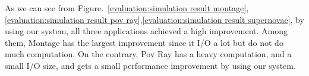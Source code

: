 As we can see from Figure.~\ref{evaluation:simulation result montage},\ref{evaluation:simulation
result pov ray},\ref{evaluation:simulation result supernovae}, by using our system, all three
applications achieved a high improvement.
Among them, Montage has the largest improvement since it I/O a lot but do not do much
computation.
On the contrary, Pov Ray has a heavy computation, and a small I/O size, and gets a small performance
improvement by using our system.
